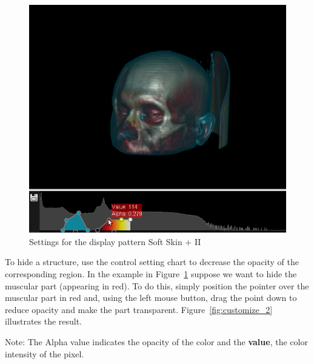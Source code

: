 \begin{figure}[!htb]
\centering
\includegraphics[scale=0.6]{../user_guide_figures/invesalius_screen/customize_1.png}
\caption{Settings for the display pattern Soft Skin + II}
\label{fig:customize_1}
\end{figure}


\newpage

To hide a structure, use the control setting chart to decrease the opacity of the corresponding region. In the example in Figure~\ref{fig:customize_1} suppose we want to hide the muscular part (appearing in red). To do this, simply position the pointer over the muscular part in red and, using the left mouse button, drag the point down to reduce opacity and make the part transparent. Figure~\ref{fig:customize_2} illustrates the result.

Note: The Alpha value indicates the opacity of the color and the \textbf{value}, the color intensity of the pixel.

